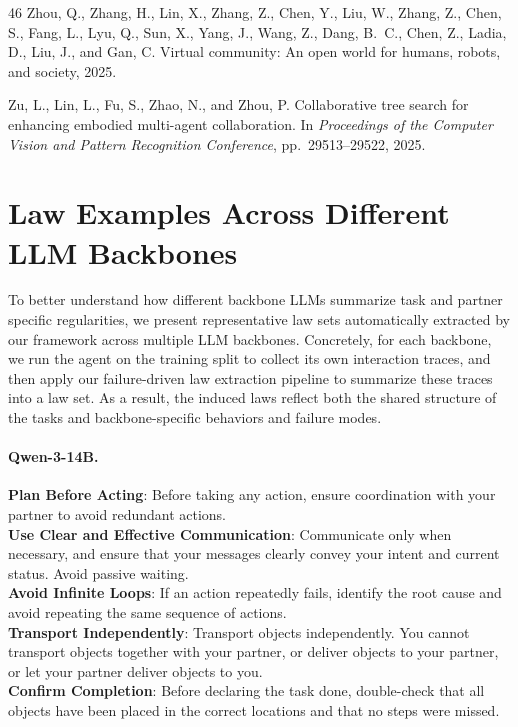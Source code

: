 \documentclass{article}
\theoremstyle{plain}
\theoremstyle{definition}
\theoremstyle{remark}
\begin{document}
\begin{thebibliography}{46}
Zhou, Q., Zhang, H., Lin, X., Zhang, Z., Chen, Y., Liu, W., Zhang, Z., Chen,
  S., Fang, L., Lyu, Q., Sun, X., Yang, J., Wang, Z., Dang, B.~C., Chen, Z.,
  Ladia, D., Liu, J., and Gan, C.
\newblock Virtual community: An open world for humans, robots, and society,
  2025.

Zu, L., Lin, L., Fu, S., Zhao, N., and Zhou, P.
\newblock Collaborative tree search for enhancing embodied multi-agent
  collaboration.
\newblock In \emph{Proceedings of the Computer Vision and Pattern Recognition
  Conference}, pp.\  29513--29522, 2025.

\end{thebibliography}

\newpage
\appendix
\onecolumn

\section{Law Examples Across Different LLM Backbones}
\label{sec:appendix-law-examples}

To better understand how different backbone LLMs summarize task and partner specific regularities, we present representative law sets automatically extracted by our framework across multiple LLM backbones. Concretely, for each backbone, we run the agent on the training split to collect its own interaction traces, and then apply our failure-driven law extraction pipeline to summarize these traces into a law set. As a result, the induced laws reflect both the shared structure of the tasks and backbone-specific behaviors and failure modes.

\paragraph{Qwen-3-14B.}
\begin{mdframed}[linewidth=0.8pt, roundcorner=4pt, innerleftmargin=6pt, innerrightmargin=6pt]
\textbf{Plan Before Acting}: Before taking any action, ensure coordination with your partner to avoid redundant actions. \\
\textbf{Use Clear and Effective Communication}: Communicate only when necessary, and ensure that your messages clearly convey your intent and current status. Avoid passive waiting. \\
\textbf{Avoid Infinite Loops}: If an action repeatedly fails, identify the root cause and avoid repeating the same sequence of actions. \\
\textbf{Transport Independently}: Transport objects independently. You cannot transport objects together with your partner, or deliver objects to your partner, or let your partner deliver objects to you. \\
\textbf{Confirm Completion}: Before declaring the task done, double-check that all objects have been placed in the correct locations and that no steps were missed.
\end{mdframed}
\end{document}
